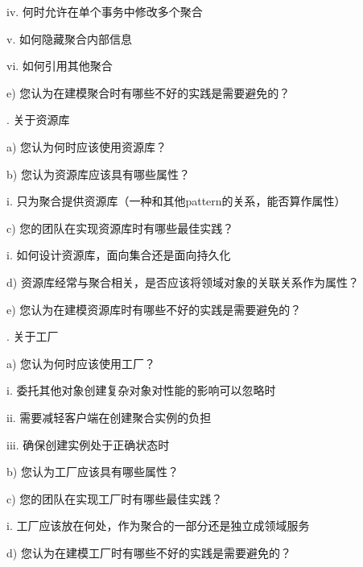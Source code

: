 \documentclass[macfonts,master,oneside]{njuthesis}
\begin{document}
\noindent
iv.	何时允许在单个事务中修改多个聚合

\noindent
v.	如何隐藏聚合内部信息

\noindent
vi.	如何引用其他聚合

\noindent
e)	您认为在建模聚合时有哪些不好的实践是需要避免的？

.	关于资源库

\noindent
a)	您认为何时应该使用资源库？

\noindent
b)	您认为资源库应该具有哪些属性？

\noindent
i.	只为聚合提供资源库（一种和其他pattern的关系，能否算作属性）

\noindent
c)	您的团队在实现资源库时有哪些最佳实践？

\noindent
i.	如何设计资源库，面向集合还是面向持久化

\noindent
d)	资源库经常与聚合相关，是否应该将领域对象的关联关系作为属性？

\noindent
e)	您认为在建模资源库时有哪些不好的实践是需要避免的？


.	关于工厂

\noindent
a)	您认为何时应该使用工厂？

\noindent
i.	委托其他对象创建复杂对象对性能的影响可以忽略时

\noindent
ii.	需要减轻客户端在创建聚合实例的负担

\noindent
iii.	确保创建实例处于正确状态时

\noindent
b)	您认为工厂应该具有哪些属性？

\noindent
c)	您的团队在实现工厂时有哪些最佳实践？

\noindent
i.	工厂应该放在何处，作为聚合的一部分还是独立成领域服务

\noindent
d)	您认为在建模工厂时有哪些不好的实践是需要避免的？
\end{document}
